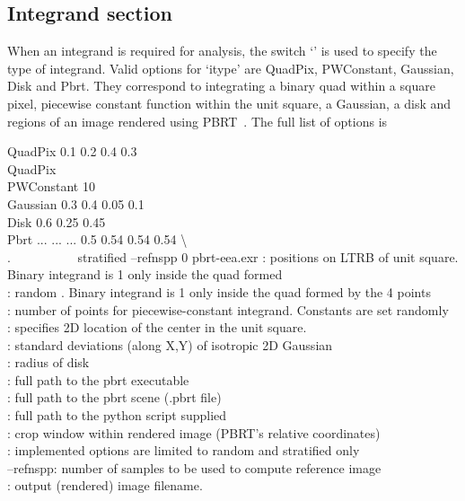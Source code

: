 \subsection{Integrand section}
When an integrand is required for analysis, the switch `' is used to specify the type of integrand. Valid options for `itype' are QuadPix, PWConstant, Gaussian, Disk and Pbrt. They correspond to integrating a binary quad within a square pixel, piecewise constant function within the unit square, a Gaussian, a disk and regions of an image rendered using PBRT~\cite{Pharr:2010:PBR:1854996}. The full list of options is
\begin{tcolorbox}
    QuadPix  0.1 0.2 0.4 0.3 \\
    QuadPix  \\
    PWConstant  10 \\
    Gaussian  0.3 0.4  0.05 0.1 \\
    Disk  0.6 0.25  0.45 \\
    Pbrt  ...  ...  ...  0.5 0.54 0.54 0.54 \textbackslash \\
  $.\quad\quad\quad\quad \quad$  stratified --refnspp 0  pbrt-eea.exr 
 \tcblower
 : positions on LTRB of unit square. Binary integrand is 1 only inside the quad formed\\
 : random . Binary integrand is 1 only inside the quad formed by the 4 points\\
 : number of points for piecewise-constant integrand. Constants are set randomly\\
 : specifies 2D location of the center in the unit square.\\
 : standard deviations (along X,Y) of isotropic 2D Gaussian\\
 : radius of disk \\
 : full path to the pbrt executable \\
 : full path to the pbrt scene (.pbrt file)\\
 : full path to the python script supplied\\
 : crop window within rendered image (PBRT's relative coordinates) \\
 : implemented options are limited to random and stratified only\\
 --refnspp: number of samples to be used to compute reference image \\
 : output (rendered) image filename.
\end{tcolorbox}
